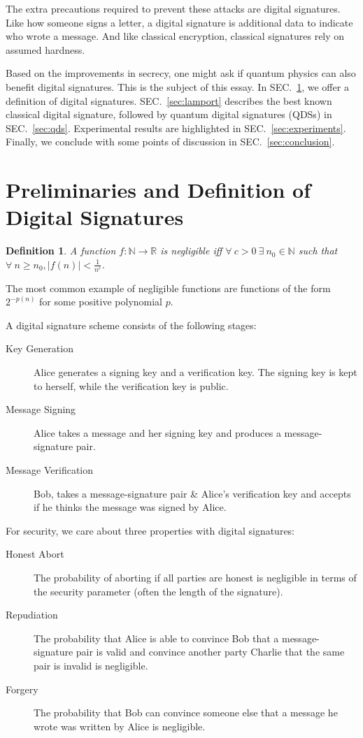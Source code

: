 \documentclass[%
 reprint,
 amsmath,amssymb,
 aps,
 pra,
]{revtex4-1}
\newtheorem{definition}{Definition}[section]
\begin{document}
The extra precautions required to prevent these attacks are digital signatures. Like how someone signs a letter, a digital signature is additional data to indicate who wrote a message. And like classical encryption, classical signatures rely on assumed hardness.

Based on the improvements in secrecy, one might ask if quantum physics can also benefit digital signatures. This is the subject of this essay. In SEC.\ \ref{sec:def}, we offer a definition of digital signatures. SEC.\ \ref{sec:lamport} describes the best known classical digital signature, followed by quantum digital signatures (QDSs) in SEC.\ \ref{sec:qds}. Experimental results are highlighted in SEC.\ \ref{sec:experiments}. Finally, we conclude with some points of discussion in SEC.\ \ref{sec:conclusion}.

\section{Preliminaries and Definition of Digital Signatures}
\label{sec:def}

\begin{definition}
A function $f:\mathbb{N}\rightarrow\mathbb{R}$ is negligible iff $\forall~ c > 0 ~\exists~ n_0 \in \mathbb{N}$ such that $\forall~ n \geq n_0, |f(n)| < \frac{1}{n^c}$.
\end{definition}

The most common example of negligible functions are functions of the form $2^{-p(n)}$ for some positive polynomial $p$.

A digital signature scheme consists of the following stages:

\begin{description}
\item[Key Generation]Alice generates a signing key and a verification key. The signing key is kept to herself, while the verification key is public.
\item[Message Signing]Alice takes a message and her signing key and produces a message-signature pair.
\item[Message Verification]Bob, takes a message-signature pair \& Alice's verification key and accepts if he thinks the message was signed by Alice.
\end{description}

For security, we care about three properties with digital signatures:

\begin{description}
\item[Honest Abort]The probability of aborting if all parties are honest is negligible in terms of the security parameter (often the length of the signature).
\item[Repudiation]The probability that Alice is able to convince Bob that a message-signature pair is valid and convince another party Charlie that the same pair is invalid is negligible.
\item[Forgery]The probability that Bob can convince someone else that a message he wrote was written by Alice is negligible.
\end{description}
\end{document}

